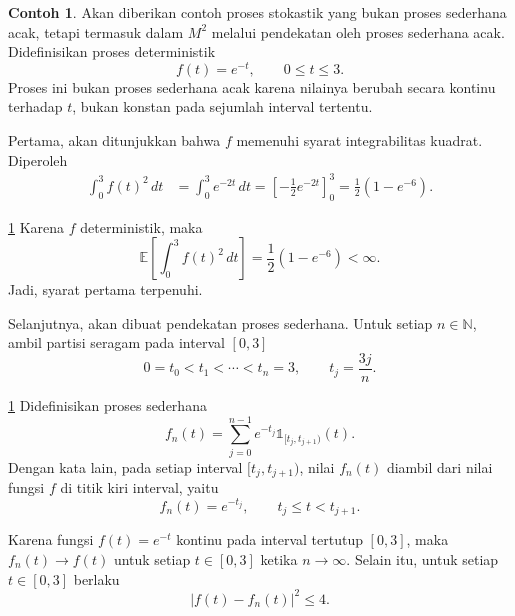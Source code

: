 \documentclass[aspectratio=169,11pt]{beamer}
\theoremstyle{definition}
\newtheorem{contoh}{Contoh}
\newcommand{\myref}[1]{\hyperref[#1]{\nameCref{#1} \ref*{#1}}}
\begin{document}
\begin{frame}{\insertsection}{\insertsubsection}
  \begin{contoh}\label{cth:5.6}
    Akan diberikan contoh proses stokastik yang bukan proses sederhana acak, tetapi
    termasuk dalam $M^2$ melalui pendekatan oleh proses sederhana acak.
    Didefinisikan proses deterministik
    \[
      f(t)=e^{-t},
      \qquad 0\leq t\leq 3.
    \]
    Proses ini bukan proses sederhana acak karena nilainya berubah secara kontinu
    terhadap $t$, bukan konstan pada sejumlah interval tertentu.

    Pertama, akan ditunjukkan bahwa $f$ memenuhi syarat integrabilitas kuadrat.
    Diperoleh
    \[
      \begin{aligned}
        \int_0^3 f(t)^2\,dt
         & =
        \int_0^3 e^{-2t}\,dt            =
        \left[-\frac{1}{2}e^{-2t}\right]_0^3 =
        \frac{1}{2}(1-e^{-6}).
      \end{aligned}
    \]
  \end{contoh}
\end{frame}

\begin{frame}{\insertsection}{\insertsubsection}
  \begin{exampleblock}{\myref{cth:5.6}}
    Karena $f$ deterministik, maka
    \[
      \mathbb{E}\left[
        \int_0^3 f(t)^2\,dt
        \right]
      =
      \frac{1}{2}(1-e^{-6})
      <
      \infty.
    \]
    Jadi, syarat pertama terpenuhi.

    Selanjutnya, akan dibuat pendekatan proses sederhana. Untuk setiap $n\in\mathbb{N}$,
    ambil partisi seragam pada interval $[0,3]$
    \[
      0=t_0<t_1<\cdots<t_n=3,
      \qquad
      t_j=\frac{3j}{n}.
    \]
  \end{exampleblock}
\end{frame}
\begin{frame}{\insertsection}{\insertsubsection}
  \begin{exampleblock}{\myref{cth:5.6}}
    Didefinisikan proses sederhana
    \[
      f_n(t)
      =
      \sum_{j=0}^{n-1}
      e^{-t_j}\mathds{1}_{[t_j,t_{j+1})}(t).
    \]
    Dengan kata lain, pada setiap interval $[t_j,t_{j+1})$, nilai $f_n(t)$ diambil
    dari nilai fungsi $f$ di titik kiri interval, yaitu
    \[
      f_n(t)=e^{-t_j},
      \qquad t_j\leq t<t_{j+1}.
    \]

    Karena fungsi $f(t)=e^{-t}$ kontinu pada interval tertutup $[0,3]$, maka
    $f_n(t)\to f(t)$ untuk setiap $t\in[0,3]$ ketika $n\to\infty$. Selain itu,
    untuk setiap $t\in[0,3]$ berlaku
    \[
      |f(t)-f_n(t)|^2 \leq 4.
    \]
  \end{exampleblock}
\end{frame}
\end{document}
